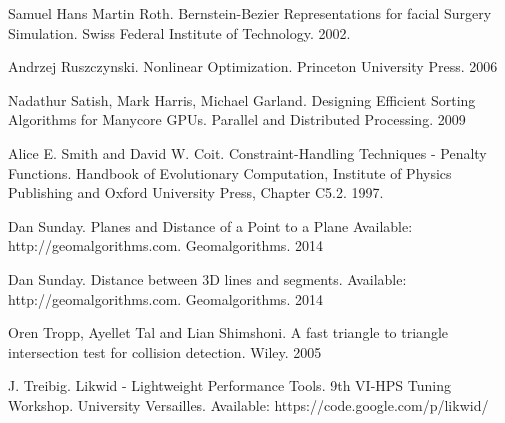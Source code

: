 \documentclass[times,12pt]{ACME2015article}
\begin{document}
\begin{thebibliography}{99}
Samuel Hans Martin Roth. Bernstein-Bezier Representations for facial Surgery Simulation. Swiss Federal Institute of Technology. 2002.

Andrzej Ruszczynski. Nonlinear Optimization. Princeton University Press. 2006

Nadathur Satish, Mark Harris, Michael Garland. Designing Efficient Sorting Algorithms for Manycore GPUs. Parallel and Distributed Processing. 2009

Alice E. Smith and David W. Coit. Constraint-Handling Techniques - Penalty Functions. Handbook of Evolutionary Computation, Institute of Physics Publishing and Oxford University Press, Chapter C5.2. 1997.

Dan Sunday. Planes and Distance of a Point to a Plane Available: http://geomalgorithms.com. Geomalgorithms. 2014

Dan Sunday. Distance between 3D lines and segments. Available: http://geomalgorithms.com. Geomalgorithms. 2014

Oren Tropp, Ayellet Tal and Lian Shimshoni. A fast triangle to triangle intersection test for collision detection. Wiley. 2005

J. Treibig. Likwid - Lightweight Performance Tools. 9th VI-HPS Tuning Workshop. University Versailles. Available: https://code.google.com/p/likwid/

\end{thebibliography}
\end{document}
